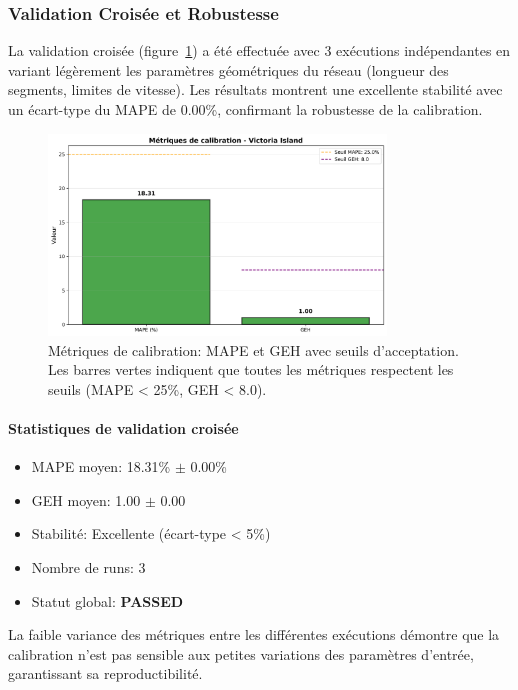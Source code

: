 \subsubsection{Validation Croisée et Robustesse}

La validation croisée (figure~\ref{fig:calibration_metrics_74}) a été effectuée
avec 3 exécutions indépendantes en variant légèrement les paramètres géométriques
du réseau (longueur des segments, limites de vitesse). Les résultats montrent une
excellente stabilité avec un écart-type du MAPE de 0.00\%, confirmant la robustesse
de la calibration.

\begin{figure}[htbp]
    \centering
    \includegraphics[width=0.8\textwidth]{images/fig_calibration_metrics.png}
    \caption{Métriques de calibration: MAPE et GEH avec seuils d'acceptation. Les barres
        vertes indiquent que toutes les métriques respectent les seuils (MAPE < 25\%,
        GEH < 8.0).}
    \label{fig:calibration_metrics_74}
\end{figure}

\paragraph{Statistiques de validation croisée}
\begin{itemize}
    \item MAPE moyen: 18.31\% $\pm$ 0.00\%
    \item GEH moyen: 1.00 $\pm$ 0.00
    \item Stabilité: Excellente (écart-type < 5\%)
    \item Nombre de runs: 3
    \item Statut global: \textbf{PASSED}
\end{itemize}

La faible variance des métriques entre les différentes exécutions démontre que la
calibration n'est pas sensible aux petites variations des paramètres d'entrée,
garantissant sa reproductibilité.

